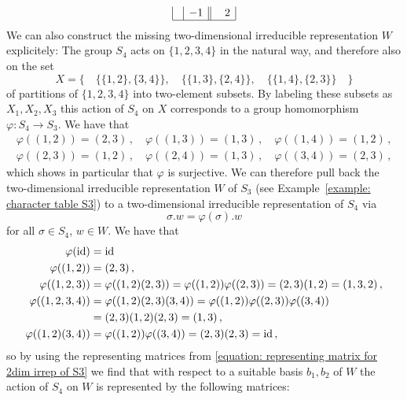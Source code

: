 \begin{example}
\[\begin{array}{|c|c||c|c|c|c|c|}
      &           -1
      & \phantom{-}2
      \\
      \hline
    \end{array}
  \]
  We can also construct the missing two-dimensional irreducible representation $W$ explicitely:
  The group $S_4$ acts on $\{1,2,3,4\}$ in the natural way, and therefore also on the set
  \[
      X
    = \big\{
        \quad
        \{\{1,2\},\{3,4\}\},
        \quad
        \{\{1,3\},\{2,4\}\},
        \quad
        \{\{1,4\},\{2,3\}\}
        \quad
      \big\}
  \]
  of partitions of $\{1,2,3,4\}$ into two-element subsets.
  By labeling these subsets as $X_1, X_2, X_3$ this action of $S_4$ on $X$ corresponds to a group homomorphism $\varphi \colon S_4 \to S_3$.
  We have that
  \begin{gather*}
      \varphi( (1,2) )
    = (2,3) \,,
    \quad
      \varphi( (1,3) )
    = (1,3) \,,
    \quad
      \varphi( (1,4) )
    = (1,2) \,,
    \\
      \varphi( (2,3) )
    = (1,2) \,,
    \quad
      \varphi( (2,4) )
    = (1,3) \,,
    \quad
      \varphi( (3,4) )
    = (2,3) \,,
  \end{gather*}
  which shows in particular that $\varphi$ is surjective.
  We can therefore pull back the two-dimensional irreducible representation $W$ of $S_3$ (see Example~\ref{example: character table S3}) to a two-di\-men\-sion\-al irreducible representation of $S_4$ via
  \[
      \sigma . w
    = \varphi(\sigma) . w
  \]
  for all $\sigma \in S_4$, $w \in W$.
  We have that
  \begin{align*}
        \varphi(\operatorname{id})
    &=  \operatorname{id}
    \\
        \varphi( (1,2) )
    &=  (2,3) \,,
    \\
        \varphi( (1,2,3) )
    &=  \varphi( (1,2) (2,3) )
     =  \varphi( (1,2) ) \varphi( (2,3) )
     =  (2,3) (1,2)
     =  (1,3,2) \,,
    \\
        \varphi( (1,2,3,4) )
    &=  \varphi( (1,2) (2,3) (3,4) )
     =  \varphi( (1,2) ) \varphi( (2,3) ) \varphi( (3,4) )  \\
    &=  (2,3) (1,2) (2,3)
     =  (1,3) \,,
    \\
        \varphi( (1,2) (3,4) )
    &=  \varphi( (1,2) ) \varphi( (3,4) )
     =  (2,3) (2,3)
     =  \operatorname{id} \,,
  \end{align*}
  so by using the representing matrices from \eqref{equation: representing matrix for 2dim irrep of S3} we find that with respect to a suitable basis $b_1, b_2$ of $W$ the action of $S_4$ on $W$ is represented by the following matrices:

\end{example}
